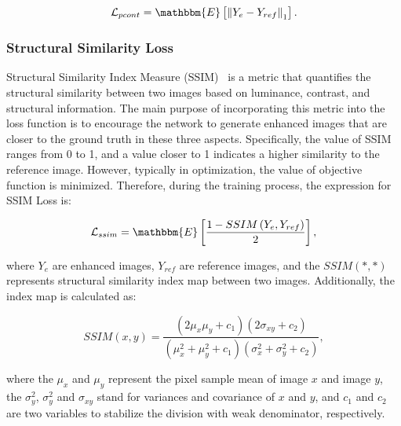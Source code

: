 \documentclass[runningheads]{llncs}
\begin{document}
\begin{equation}
    \mathcal{L}_{pcont} =  \mathbbm{E}\left[{\left\| Y_{e} - Y_{ref} \right\|}_{1}\right].
\end{equation}

\subsubsection{Structural Similarity Loss}
Structural Similarity Index Measure (SSIM)~\cite{wang2004image,liu2017reduced} is a metric that quantifies the structural similarity between two images based on luminance, contrast, and structural information. The main purpose of incorporating this metric into the loss function is to encourage the network to generate enhanced images that are closer to the ground truth in these three aspects. Specifically, the value of SSIM ranges from 0 to 1, and a value closer to 1 indicates a higher similarity to the reference image. However, typically in optimization, the value of objective function is minimized. Therefore, during the training process, the expression for SSIM Loss is:

\begin{equation}
    \mathcal{L}_{ssim} = \mathbbm{E}\left[ \frac{1 - SSIM\left(Y_{e}, Y_{ref}\right)}{2} \right],
\end{equation}

\noindent where $Y_{e}$ are enhanced images, $Y_{ref}$ are reference images, and the $SSIM\left(*,*\right)$~\cite{wang2004image} represents structural similarity index map between two images. Additionally, the index map is calculated as:

\begin{equation}
    SSIM(x, y) = \frac{\left( 2\mu_{x}\mu_{y} + c_{1} \right) \left( 
2\sigma_{xy} + c_{2} \right)}{\left( \mu_{x}^{2} + \mu_{y}^{2} + c_{1} \right) \left( \sigma_{x}^{2} + \sigma_{y}^{2} + c_{2} \right)},
\end{equation}

\noindent where the $\mu_{x}$ and  $\mu_{y}$ represent the pixel sample mean of image $x$ and image $y$, the $\sigma_{y}^{2}$, $\sigma_{y}^{2}$ and $\sigma_{xy}$ stand for variances and covariance of $x$ and $y$, and $c_{1}$ and $c_{2}$ are two variables to stabilize the division with weak denominator, respectively.
\end{document}
